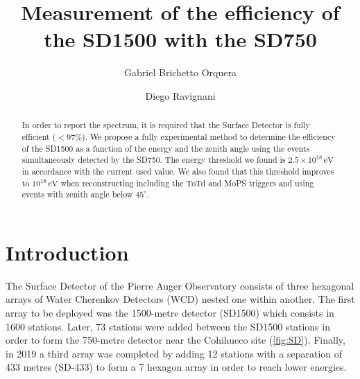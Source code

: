 \documentclass[12pt,a4paper]{article}
\newcommand{\eV}{\, \mathrm{eV}}
\begin{document}

\title{\textbf{Measurement of the efficiency of the SD1500 with the SD750}}



\author{Gabriel Brichetto Orquera}
\author{Diego Ravignani}

\date{\vspace{-2cm}} %

\maketitle

\vspace{2pt}
\begin{abstract}
In order to report the spectrum, it is required that the Surface Detector is fully efficient ($<97\%$).
We propose a fully experimental method to determine the efficiency of the SD1500 as a function of the energy and the zenith angle using the events simultaneously detected by the SD750. The energy threshold we found is $2.5\times10^{18}\eV$ in accordance with the current used value. We also found that this threshold improves to $10^{18}\eV$ when reconstructing including the ToTd and MoPS triggers and using events with zenith angle below $45^{\circ}$.
\end{abstract}


\section{Introduction}

The Surface Detector of the Pierre Auger Observatory consists of three hexagonal arrays of Water Cherenkov Detectors (WCD) nested one within another. The first array to be deployed was the 1500-metre detector (SD1500) which consists in 1600 stations. Later, 73 stations were added between the SD1500 stations in order to form the 750-metre detector near the Cohihueco site (\cref{fig:SD}). Finally, in 2019 a third array was completed by adding 12 stations with a separation of 433 metres (SD-433) to form a 7 hexagon array in order to reach lower energies. 
\end{document}
